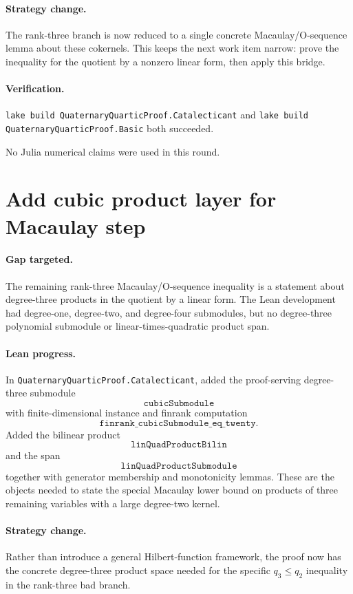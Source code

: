 \documentclass[11pt]{article}
\begin{document}
\paragraph{Strategy change.}
The rank-three branch is now reduced to a single concrete Macaulay/O-sequence
lemma about these cokernels.  This keeps the next work item narrow: prove the
inequality for the quotient by a nonzero linear form, then apply this bridge.

\paragraph{Verification.}
\texttt{lake build QuaternaryQuarticProof.Catalecticant} and
\texttt{lake build QuaternaryQuarticProof.Basic} both succeeded.

No Julia numerical claims were used in this round.

\section*{Add cubic product layer for Macaulay step}

\paragraph{Gap targeted.}
The remaining rank-three Macaulay/O-sequence inequality is a statement about
degree-three products in the quotient by a linear form.  The Lean development
had degree-one, degree-two, and degree-four submodules, but no degree-three
polynomial submodule or linear-times-quadratic product span.

\paragraph{Lean progress.}
In \texttt{QuaternaryQuarticProof.Catalecticant}, added the proof-serving
degree-three submodule
\[
\texttt{cubicSubmodule}
\]
with finite-dimensional instance and finrank computation
\[
\texttt{finrank\_cubicSubmodule\_eq\_twenty}.
\]
Added the bilinear product
\[
\texttt{linQuadProductBilin}
\]
and the span
\[
\texttt{linQuadProductSubmodule}
\]
together with generator membership and monotonicity lemmas.  These are the
objects needed to state the special Macaulay lower bound on products of three
remaining variables with a large degree-two kernel.

\paragraph{Strategy change.}
Rather than introduce a general Hilbert-function framework, the proof now has
the concrete degree-three product space needed for the specific \(q_3\le q_2\)
inequality in the rank-three bad branch.
\end{document}
